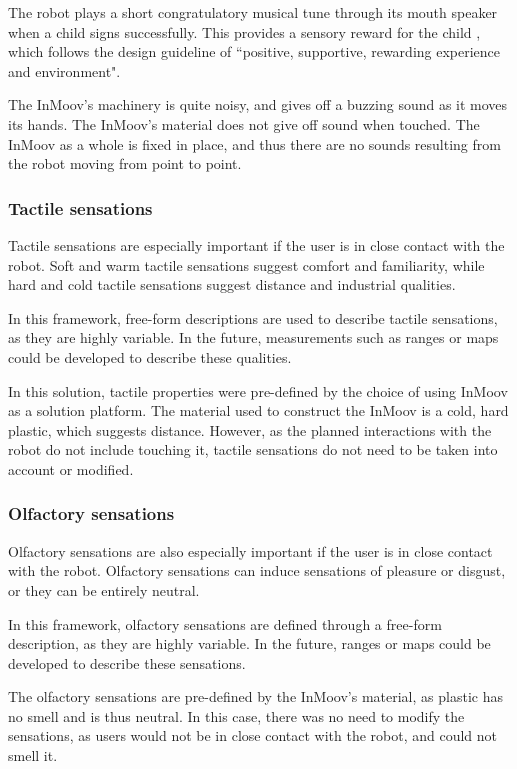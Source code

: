 The robot plays a short congratulatory musical tune through its mouth speaker when a child signs successfully. This provides a sensory reward for the child \cite{robins2007eliciting, michaud2003characteristics}, which follows the design guideline of ``positive, supportive, rewarding experience and environment". 

The InMoov's machinery is quite noisy, and gives off a buzzing sound as it moves its hands. The InMoov's material does not give off sound when touched. The InMoov as a whole is fixed in place, and thus there are no sounds resulting from the robot moving from point to point.


\subsubsection{Tactile sensations}

Tactile sensations are especially important if the user is in close contact with the robot. Soft and warm tactile sensations suggest comfort and familiarity, while hard and cold tactile sensations suggest distance and industrial qualities.

In this framework, free-form descriptions are used to describe tactile sensations, as they are highly variable. In the future, measurements such as ranges or maps could be developed to describe these qualities.

In this solution, tactile properties were pre-defined by the choice of using InMoov as a solution platform. The material used to construct the InMoov is a cold, hard plastic, which suggests distance. However, as the planned interactions with the robot do not include touching it, tactile sensations do not need to be taken into account or modified.


\subsubsection{Olfactory sensations}

Olfactory sensations are also especially important if the user is in close contact with the robot. Olfactory sensations can induce sensations of pleasure or disgust, or they can be entirely neutral.

In this framework, olfactory sensations are defined through a free-form description, as they are highly variable. In the future, ranges or maps could be developed to describe these sensations. 

The olfactory sensations are pre-defined by the InMoov's material, as plastic has no smell and is thus neutral. In this case, there was no need to modify the sensations, as users would not be in close contact with the robot, and could not smell it. 


